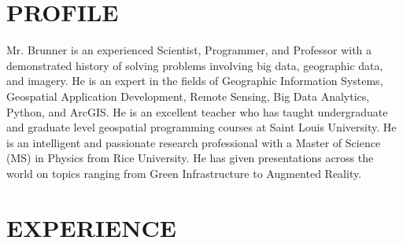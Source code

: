 \documentclass{res}
\begin{document}
 
\address{\bf HOME ADDRESS\\122 Arabian Path\\ 
St. Peters, MO 63376\\ 636-222-3818\\ gregbrunn@gmail.com}
\address{\bf WORK ADDRESS \\ 3060 Little Hills Expy\\  St. Charles, MO 63301\\  636-949-6620 ext. 8557\\
gbrunner@esri.com}
                                  
\begin{resume}
\section{PROFILE}
Mr. Brunner is an experienced Scientist, Programmer, and Professor with a demonstrated history of solving problems involving big data, geographic data, and imagery. He is an expert in the fields of Geographic Information Systems, Geospatial Application Development, Remote Sensing, Big Data Analytics, Python, and ArcGIS. He is an excellent teacher who has taught undergraduate and graduate level geospatial programming courses at Saint Louis University. He is an intelligent and passionate research professional with a Master of Science (MS) in Physics from Rice University. He has given presentations across the world on topics ranging from Green Infrastructure to Augmented Reality.

\section{EXPERIENCE}
   \vspace{-0.1in}	


\end{resume}
\end{document}

